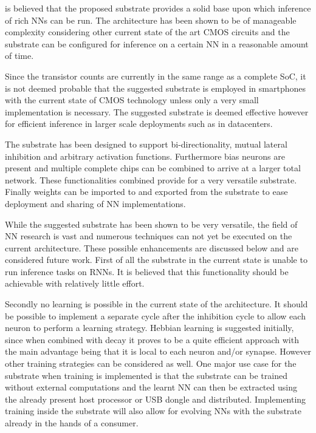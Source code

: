  is believed that the proposed substrate provides a solid base upon which inference of rich \acp{NN} can be run. The architecture has been shown to be of manageable complexity considering other current state of the art \ac{CMOS} circuits and the substrate can be configured for inference on a certain \ac{NN} in a reasonable amount of time.

Since the transistor counts are currently in the same range as a complete \ac{SoC}, it is not deemed probable that the suggested substrate is employed in smartphones with the current state of \ac{CMOS} technology unless only a very small implementation is necessary. The suggested substrate is deemed effective however for efficient inference in larger scale deployments such as in datacenters.

The substrate has been designed to support bi-directionality, mutual lateral inhibition and arbitrary activation functions. Furthermore bias neurons are present and multiple complete chips can be combined to arrive at a larger total network. These functionalities combined provide for a very versatile substrate. Finally weights can be imported to and exported from the substrate to ease deployment and sharing of \ac{NN} implementations.

While the suggested substrate has been shown to be very versatile, the field of \ac{NN} research is vast and numerous techniques can not yet be executed on the current architecture. These possible enhancements are discussed below and are considered future work. First of all the substrate in the current state is unable to run inference tasks on \acp{RNN}. It is believed that this functionality should be achievable with relatively little effort.

Secondly no learning is possible in the current state of the architecture. It should be possible to implement a separate cycle after the inhibition cycle to allow each neuron to perform a learning strategy. Hebbian learning is suggested initially, since when combined with decay it proves to be a quite efficient approach with the main advantage being that it is local to each neuron and/or synapse. However other training strategies can be considered as well. One major use case for the substrate when training is implemented is that the substrate can be trained without external computations and the learnt \ac{NN} can then be extracted using the already present host processor or USB dongle and distributed. Implementing training inside the substrate will also allow for evolving \acp{NN} with the substrate already in the hands of a consumer.

